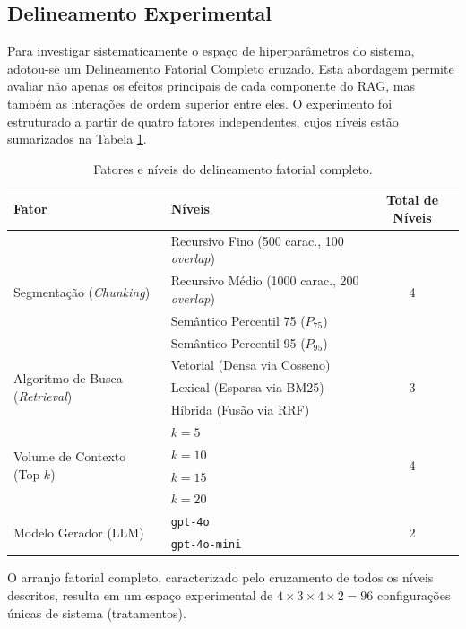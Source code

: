 \subsection{Delineamento Experimental}

Para investigar sistematicamente o espaço de hiperparâmetros do sistema, adotou-se um Delineamento Fatorial Completo cruzado. Esta abordagem permite avaliar não apenas os efeitos principais de cada componente do RAG, mas também as interações de ordem superior entre eles. O experimento foi estruturado a partir de quatro fatores independentes, cujos níveis estão sumarizados na Tabela \ref{tab:fatores_experimento}.

\begin{table}[!htb]
  \centering
  \caption{Fatores e níveis do delineamento fatorial completo.}
  \label{tab:fatores_experimento}
  \begin{tabular}{@{}llc@{}}
    \toprule
    \textbf{Fator} & \textbf{Níveis} & \textbf{Total de Níveis} \\ \midrule
    \multirow{4}{*}{Segmentação (\textit{Chunking})} & Recursivo Fino (500 carac., 100 \textit{overlap}) & \multirow{4}{*}{4} \\
    & Recursivo Médio (1000 carac., 200 \textit{overlap}) &  \\
    & Semântico Percentil 75 ($P_{75}$) &  \\
    & Semântico Percentil 95 ($P_{95}$) &  \\ \midrule
    \multirow{3}{*}{Algoritmo de Busca (\textit{Retrieval})} & Vetorial (Densa via Cosseno) & \multirow{3}{*}{3} \\
    & Lexical (Esparsa via BM25) &  \\
    & Híbrida (Fusão via RRF) &  \\ \midrule
    \multirow{4}{*}{Volume de Contexto (Top-$k$)} & $k = 5$ & \multirow{4}{*}{4} \\
    & $k = 10$ &  \\
    & $k = 15$ &  \\
    & $k = 20$ &  \\ \midrule
    \multirow{2}{*}{Modelo Gerador (LLM)} & \texttt{gpt-4o} & \multirow{2}{*}{2} \\
    & \texttt{gpt-4o-mini} &  \\ \bottomrule
  \end{tabular}
\end{table}

O arranjo fatorial completo, caracterizado pelo cruzamento de todos os níveis descritos, resulta em um espaço experimental de $4 \times 3 \times 4 \times 2 = 96$ configurações únicas de sistema (tratamentos).

